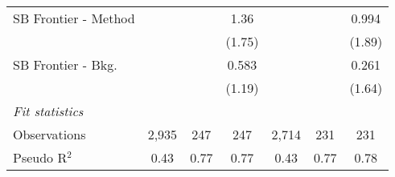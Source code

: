 \begin{tabular}{lcccccc}
   SB Frontier - Method &         &         & 1.36    &         &        & 0.994\\   
                        &         &         & (1.75)  &         &        & (1.89)\\   
   SB Frontier - Bkg.   &         &         & 0.583   &         &        & 0.261\\   
                        &         &         & (1.19)  &         &        & (1.64)\\   
   \midrule
   \emph{Fit statistics}\\
   Observations         & 2,935   & 247     & 247     & 2,714   & 231    & 231\\  
   Pseudo R$^2$         & 0.43    & 0.77    & 0.77    & 0.43    & 0.77   & 0.78\\  
   

\end{tabular}

